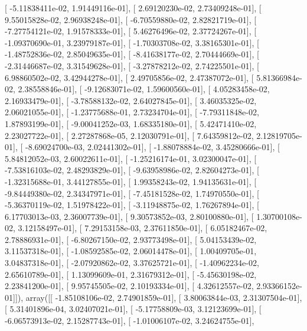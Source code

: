 \documentclass{article}
\begin{document}
       [ -5.11838411e-02,   1.91449116e-01],
       [  2.69120230e-02,   2.73409248e-01],
       [  9.55015828e-02,   2.96938248e-01],
       [ -6.70559880e-02,   2.82821719e-01],
       [ -7.27754121e-02,   1.91578333e-01],
       [  5.46276496e-02,   2.37724267e-01],
       [ -1.09370690e-01,   3.23979187e-01],
       [ -1.70303708e-02,   3.38165301e-01],
       [ -1.48752836e-02,   2.85049635e-01],
       [ -8.41638177e-02,   2.70444669e-01],
       [ -2.31446687e-02,   3.31549628e-01],
       [ -3.27878212e-02,   2.74225501e-01],
       [  6.98860502e-02,   3.42944278e-01],
       [  2.49705856e-02,   2.47387072e-01],
       [  5.81366984e-02,   2.38558846e-01],
       [ -9.12683071e-02,   1.59600560e-01],
       [  4.05283458e-02,   2.16933479e-01],
       [ -3.78588132e-02,   2.64027845e-01],
       [  3.46035325e-02,   2.06021055e-01],
       [ -1.23775688e-01,   2.73234704e-01],
       [ -7.79311848e-02,   1.87893199e-01],
       [ -9.00041252e-03,   1.68335180e-01],
       [  5.42471410e-02,   2.23027722e-01],
       [  2.27287868e-05,   2.12030791e-01],
       [  7.64359812e-02,   2.12819705e-01],
       [ -8.69024700e-03,   2.02441302e-01],
       [ -1.88078884e-02,   3.45280666e-01],
       [  5.84812052e-03,   2.60022611e-01],
       [ -1.25216174e-01,   3.02300047e-01],
       [ -7.53816103e-02,   2.48293829e-01],
       [ -9.63958986e-02,   2.82604273e-01],
       [ -1.32315688e-01,   3.44127855e-01],
       [  1.99358243e-02,   1.94135631e-01],
       [ -9.84449380e-02,   2.34347971e-01],
       [ -7.45181528e-02,   1.74970550e-01],
       [ -5.36370119e-02,   1.51978422e-01],
       [ -3.11948875e-02,   1.76267894e-01],
       [  6.17703013e-03,   2.36007739e-01],
       [  9.30573852e-03,   2.80100880e-01],
       [  1.30700108e-02,   3.12158497e-01],
       [  7.29153158e-03,   2.37611850e-01],
       [  6.05182467e-02,   2.78886931e-01],
       [ -6.80267150e-02,   2.93773498e-01],
       [  5.04153439e-02,   3.11537318e-01],
       [ -1.08592585e-02,   2.06014478e-01],
       [  1.00409705e-01,   3.04837318e-01],
       [ -2.07920862e-02,   3.37625721e-01],
       [ -1.40962234e-02,   2.65610789e-01],
       [  1.13099609e-01,   2.31679312e-01],
       [ -5.45630198e-02,   2.23841200e-01],
       [  9.95745505e-02,   2.10193334e-01],
       [  4.32612557e-02,   2.93366152e-01]]), array([[ -1.85108106e-02,   2.74901859e-01],
       [  3.80063844e-03,   2.31307504e-01],
       [  5.31401896e-04,   3.02407021e-01],
       [ -5.17758809e-03,   3.12123699e-01],
       [ -6.06573913e-02,   2.15287743e-01],
       [ -1.01006107e-02,   3.24624755e-01],
\end{document}
